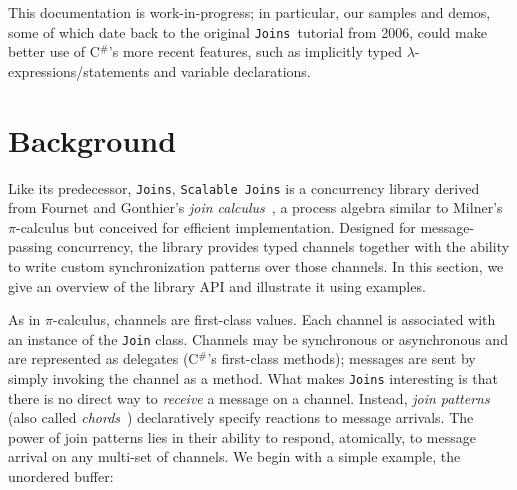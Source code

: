 \documentclass{article}
\newcommand{\csharp}{\texorpdfstring{\mbox{C$^\#$}}{C\#}}
\newcommand{\sjoins}{{\texttt{Scalable Joins}}}
\newcommand{\joins}{{\texttt{Joins}}}
\newcommand{\cjoin}{{\texttt{Join}}}
\begin{document}
This documentation is work-in-progress; in particular, our samples and demos, some of which date back to the original \joins\ tutorial \cite{joinstutorial} from 2006,
could make better use of \csharp's more recent features, such as implicitly typed $\lambda$-expressions/statements and variable declarations. 

\section{Background}\label{joins}

Like its predecessor, \joins, \sjoins{} is a concurrency
library derived from Fournet and Gonthier's \emph{join
  calculus}~\cite{FournetGonthier96,lnotes-fournet-gonthier-join-tutorial},
a process algebra similar to Milner's $\pi$-calculus but conceived for
efficient implementation.  Designed for message-passing concurrency,
the library provides typed channels together with the ability to write
custom synchronization patterns over those channels.  In this section,
we give an overview of the library API and illustrate it using
examples.

As in $\pi$-calculus, channels are first-class values.  Each channel
is associated with an instance of the \lstinline{Join} class.
 Channels may be synchronous or asynchronous and are represented as
delegates (\csharp's first-class methods); messages are sent by
 simply invoking the channel as a method.  What makes \joins{}
interesting is that there is no direct way to \emph{receive} a message
on a channel.  Instead, \emph{join patterns} (also called
\emph{chords}~\cite{polyphony-toplas}) declaratively specify reactions
to message arrivals.  The power of join patterns lies in their ability
to respond, atomically, to message arrival on any multi-set of
channels.  We begin with a simple example, the unordered buffer:


\end{document}
